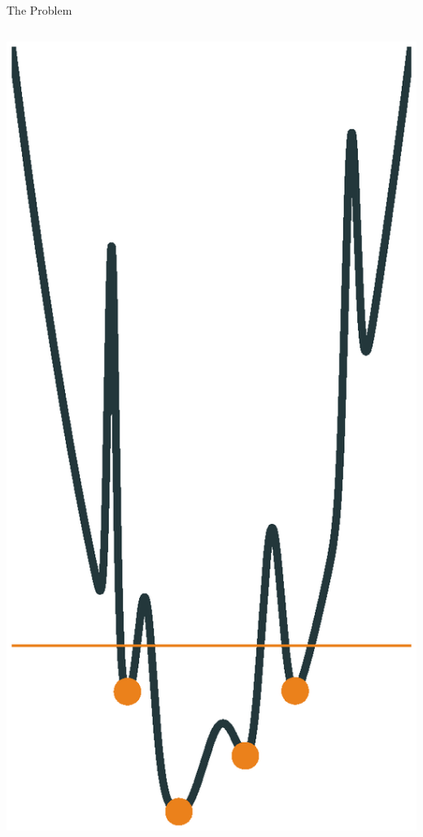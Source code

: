 \documentclass[10pt]{beamer}
\begin{document}
\begin{frame}[fragile]{The Problem}
\begin{columns}{}
\begin{column}{0.45\textwidth}
\begin{overprint}
				\includegraphics[width=0.9\linewidth]{images/cutoff.eps}
			\end{overprint}
           \end{column}
       \end{columns}     
\end{frame}
\end{document}
